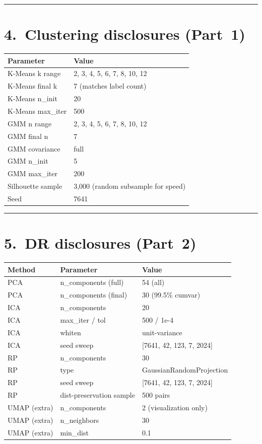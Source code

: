 \documentclass[11pt]{article}
\begin{document}
{\color{denimmid}\rule{\linewidth}{0.4pt}}

\section*{4.\ Clustering disclosures (Part~1)}

\begin{center}
\begin{tabular}{ll}
\toprule
\textbf{Parameter} & \textbf{Value} \\
\midrule
K-Means k range   & 2, 3, 4, 5, 6, 7, 8, 10, 12 \\
K-Means final k   & 7 (matches label count) \\
K-Means n\_init   & 20 \\
K-Means max\_iter & 500 \\
GMM n range       & 2, 3, 4, 5, 6, 7, 8, 10, 12 \\
GMM final n       & 7 \\
GMM covariance    & full \\
GMM n\_init       & 5 \\
GMM max\_iter     & 200 \\
Silhouette sample & 3,000 (random subsample for speed) \\
Seed              & 7641 \\
\bottomrule
\end{tabular}
\end{center}

{\color{denimmid}\rule{\linewidth}{0.4pt}}

\section*{5.\ DR disclosures (Part~2)}

\begin{center}
\begin{tabular}{lll}
\toprule
\textbf{Method} & \textbf{Parameter} & \textbf{Value} \\
\midrule
PCA & n\_components (full) & 54 (all) \\
PCA & n\_components (final) & 30 (99.5\% cumvar) \\
ICA & n\_components         & 20 \\
ICA & max\_iter / tol        & 500 / 1e-4 \\
ICA & whiten                 & unit-variance \\
ICA & seed sweep             & [7641, 42, 123, 7, 2024] \\
RP  & n\_components          & 30 \\
RP  & type                   & GaussianRandomProjection \\
RP  & seed sweep             & [7641, 42, 123, 7, 2024] \\
RP  & dist-preservation sample & 500 pairs \\
UMAP (extra) & n\_components  & 2 (visualization only) \\
UMAP (extra) & n\_neighbors    & 30 \\
UMAP (extra) & min\_dist       & 0.1 \\
\bottomrule
\end{tabular}
\end{center}
\end{document}
